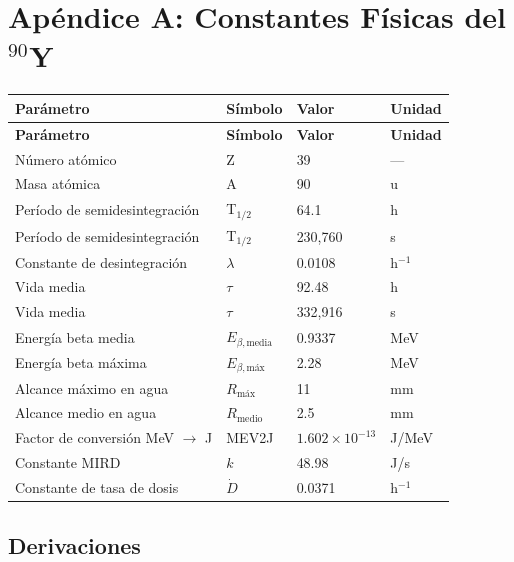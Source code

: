 \documentclass[12pt,a4paper]{article}
\begin{document}
\newpage

\section*{Apéndice A: Constantes Físicas del $^{90}$Y}

\begin{longtable}{p{6cm} p{3cm} p{2cm} p{2cm}}
\toprule
\textbf{Parámetro} & \textbf{Símbolo} & \textbf{Valor} & \textbf{Unidad} \\
\midrule
\endfirsthead
\toprule
\textbf{Parámetro} & \textbf{Símbolo} & \textbf{Valor} & \textbf{Unidad} \\
\midrule
\endhead
\bottomrule
\endfoot
Número atómico & Z & 39 & --- \\
Masa atómica & A & 90 & u \\
Período de semidesintegración & T$_{1/2}$ & 64.1 & h \\
Período de semidesintegración & T$_{1/2}$ & 230,760 & s \\
Constante de desintegración & $\lambda$ & 0.0108 & h$^{-1}$ \\
Vida media & $\tau$ & 92.48 & h \\
Vida media & $\tau$ & 332,916 & s \\
Energía beta media & $E_{\beta,\text{media}}$ & 0.9337 & MeV \\
Energía beta máxima & $E_{\beta,\text{máx}}$ & 2.28 & MeV \\
Alcance máximo en agua & $R_{\text{máx}}$ & 11 & mm \\
Alcance medio en agua & $R_{\text{medio}}$ & 2.5 & mm \\
Factor de conversión MeV $\to$ J & MEV2J & $1.602\times10^{-13}$ & J/MeV \\
Constante MIRD & $k$ & 48.98 & J/s \\
Constante de tasa de dosis & $\dot{D}$ & 0.0371 & h$^{-1}$ \\
\bottomrule
\end{longtable}

\subsection*{Derivaciones}
\end{document}
